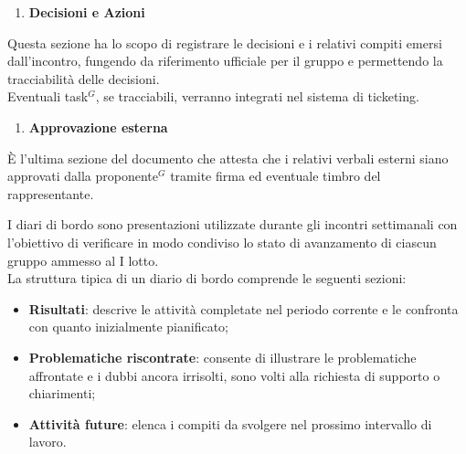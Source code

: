     \begin{enumerate}[resume*, itemsep=0pt, parsep=1pt, leftmargin=*, label=\arabic*.]
        \item \textbf{Decisioni e Azioni}
    \end{enumerate}
    \vspace{-0.5em}
    Questa sezione ha lo scopo di registrare le decisioni e i relativi compiti emersi dall'incontro, fungendo da riferimento ufficiale per il gruppo e permettendo la tracciabilità delle decisioni.\\
    Eventuali task$^G$, se tracciabili, verranno integrati nel sistema di ticketing.
    \begin{enumerate}[resume*, itemsep=0pt, parsep=1pt, leftmargin=*, label=\arabic*.]
        \item \textbf{Approvazione esterna}
    \end{enumerate}
    \vspace{-0.5em}
    È l'ultima sezione del documento che attesta che i relativi verbali esterni siano approvati dalla proponente$^G$ tramite firma ed eventuale timbro del rappresentante.

\vspace{0.7em}
    I diari di bordo sono presentazioni utilizzate durante gli incontri settimanali con l'obiettivo di verificare in modo condiviso lo stato di avanzamento di ciascun gruppo ammesso al I lotto.\\
    La struttura tipica di un diario di bordo comprende le seguenti sezioni:
    \begin{itemize}[itemsep=3pt, parsep=1pt, label=$\scriptstyle\bullet$]
        \item \textbf{Risultati}: descrive le attività completate nel periodo corrente e le confronta con quanto inizialmente pianificato;
        \item \textbf{Problematiche riscontrate}: consente di illustrare le problematiche affrontate e i dubbi ancora irrisolti, sono volti alla richiesta di supporto o chiarimenti;
        \item \textbf{Attività future}: elenca i compiti da svolgere nel prossimo intervallo di lavoro.
    \end{itemize}

